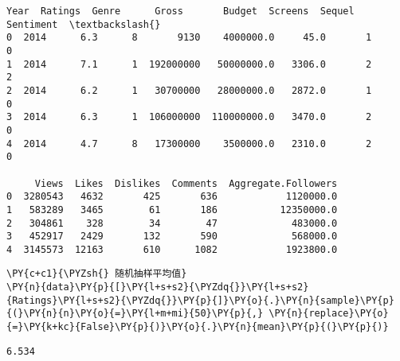             \begin{tcolorbox}[breakable, size=fbox, boxrule=.5pt, pad at break*=1mm, opacityfill=0]
\begin{Verbatim}[commandchars=\\\{\}]
   Year  Ratings  Genre      Gross       Budget  Screens  Sequel  Sentiment  \textbackslash{}
0  2014      6.3      8       9130    4000000.0     45.0       1          0
1  2014      7.1      1  192000000   50000000.0   3306.0       2          2
2  2014      6.2      1   30700000   28000000.0   2872.0       1          0
3  2014      6.3      1  106000000  110000000.0   3470.0       2          0
4  2014      4.7      8   17300000    3500000.0   2310.0       2          0

     Views  Likes  Dislikes  Comments  Aggregate.Followers
0  3280543   4632       425       636            1120000.0
1   583289   3465        61       186           12350000.0
2   304861    328        34        47             483000.0
3   452917   2429       132       590             568000.0
4  3145573  12163       610      1082            1923800.0
\end{Verbatim}
\end{tcolorbox}
        
    \begin{tcolorbox}[breakable, size=fbox, boxrule=1pt, pad at break*=1mm,colback=cellbackground, colframe=cellborder]
\begin{Verbatim}[commandchars=\\\{\}]
\PY{c+c1}{\PYZsh{} 随机抽样平均值}
\PY{n}{data}\PY{p}{[}\PY{l+s+s2}{\PYZdq{}}\PY{l+s+s2}{Ratings}\PY{l+s+s2}{\PYZdq{}}\PY{p}{]}\PY{o}{.}\PY{n}{sample}\PY{p}{(}\PY{n}{n}\PY{o}{=}\PY{l+m+mi}{50}\PY{p}{,} \PY{n}{replace}\PY{o}{=}\PY{k+kc}{False}\PY{p}{)}\PY{o}{.}\PY{n}{mean}\PY{p}{(}\PY{p}{)}
\end{Verbatim}
\end{tcolorbox}

            \begin{tcolorbox}[breakable, size=fbox, boxrule=.5pt, pad at break*=1mm, opacityfill=0]
\begin{Verbatim}[commandchars=\\\{\}]
6.534
\end{Verbatim}
\end{tcolorbox}
